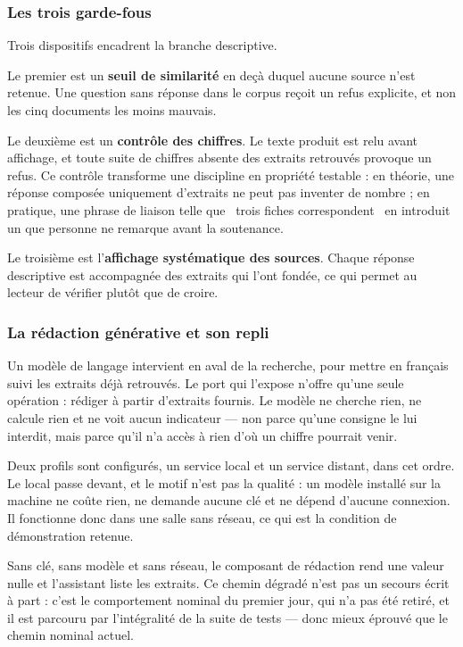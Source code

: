 \subsubsection{Les trois garde-fous}

Trois dispositifs encadrent la branche descriptive.

Le premier est un \textbf{seuil de similarité} en deçà duquel aucune source n'est retenue. Une question sans réponse dans le corpus reçoit un refus explicite, et non les cinq documents les moins mauvais.

Le deuxième est un \textbf{contrôle des chiffres}. Le texte produit est relu avant affichage, et toute suite de chiffres absente des extraits retrouvés provoque un refus. Ce contrôle transforme une discipline en propriété testable : en théorie, une réponse composée uniquement d'extraits ne peut pas inventer de nombre ; en pratique, une phrase de liaison telle que \guillemotleft~trois fiches correspondent~\guillemotright{} en introduit un que personne ne remarque avant la soutenance.

Le troisième est l'\textbf{affichage systématique des sources}. Chaque réponse descriptive est accompagnée des extraits qui l'ont fondée, ce qui permet au lecteur de vérifier plutôt que de croire.

\subsubsection{La rédaction générative et son repli}

Un modèle de langage intervient en aval de la recherche, pour mettre en français suivi les extraits déjà retrouvés. Le port qui l'expose n'offre qu'une seule opération : rédiger à partir d'extraits fournis. Le modèle ne cherche rien, ne calcule rien et ne voit aucun indicateur --- non parce qu'une consigne le lui interdit, mais parce qu'il n'a accès à rien d'où un chiffre pourrait venir.

Deux profils sont configurés, un service local et un service distant, dans cet ordre. Le local passe devant, et le motif n'est pas la qualité : un modèle installé sur la machine ne coûte rien, ne demande aucune clé et ne dépend d'aucune connexion. Il fonctionne donc dans une salle sans réseau, ce qui est la condition de démonstration retenue.

Sans clé, sans modèle et sans réseau, le composant de rédaction rend une valeur nulle et l'assistant liste les extraits. Ce chemin dégradé n'est pas un secours écrit à part : c'est le comportement nominal du premier jour, qui n'a pas été retiré, et il est parcouru par l'intégralité de la suite de tests --- donc mieux éprouvé que le chemin nominal actuel.


